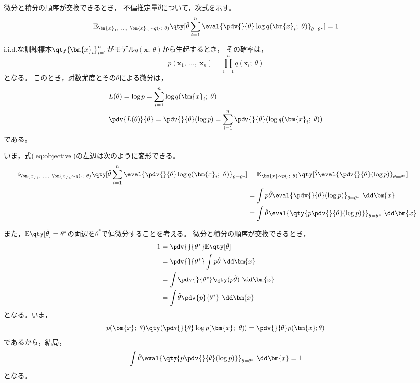 \documentclass[class=jsarticle, crop=false, dvipdfmx, fleqn]{standalone}
\begin{document}
\section{}

微分と積分の順序が交換できるとき，
不偏推定量\(\hat{\theta}\)について，次式を示す。
\begin{equation}
	\mathbb{E}_{\bm{x}_1,\ \dots,\ \bm{x}_n \sim q(\cdot;\ \theta)}
			\qty[\hat{\theta} \sum_{i=1}^{n} \eval{\pdv{}{\theta} \log{q(\bm{x}_i;\ \theta)}}_{\theta = \theta^*}]
	= 1
	\label{eq:objective}
\end{equation}

i.i.d.な訓練標本\(\qty{\bm{x}_i}_{i=1}^{n}\)がモデル\(q(\bm{x};\ \theta)\)から生起するとき，
その確率は，
\begin{equation}
	p(\bm{x}_1,\ \dots,\ \bm{x}_n) = \prod_{i=1}^{n} q(\bm{x}_i;\ \theta)
\end{equation}
となる。
このとき，対数尤度とその\(\theta\)による微分は，
\begin{align}
	& L(\theta) = \log{p} = \sum_{i=1}^{n} \log{q(\bm{x}_i;\ \theta)} \\
	& \pdv{L(\theta)}{\theta} = \pdv{}{\theta} (\log{p}) = \sum_{i=1}^{n} \pdv{}{\theta} (\log{q(\bm{x}_i;\ \theta)})
\end{align}
である。

いま，式(\ref{eq:objective})の左辺は次のように変形できる。
\begin{align}
	\mathbb{E}_{\bm{x}_1,\ \dots,\ \bm{x}_n \sim q(\cdot;\ \theta)}
			\qty[\hat{\theta} \sum_{i=1}^{n} \eval{\pdv{}{\theta} \log{q(\bm{x}_i;\ \theta)}}_{\theta = \theta^*}]
		& = \mathbb{E}_{\bm{x} \sim p(\cdot;\ \theta)} \qty[\hat{\theta} \eval{\pdv{}{\theta} (\log{p})}_{\theta = \theta^*}] \\
		& = \int p \hat{\theta} \eval{\pdv{}{\theta} (\log{p})}_{\theta = \theta^*} \ \dd\bm{x}
			\notag \\
		& = \int \hat{\theta} \eval{\qty{p \pdv{}{\theta} (\log{p})}}_{\theta = \theta^*} \ \dd\bm{x} 
			\label{eq:1}
\end{align}

また，\(\mathbb{E}\qty[\hat{\theta}] = \theta^{*}\)の両辺を\(\theta^{*}\)で偏微分することを考える。
微分と積分の順序が交換できるとき，
\begin{align}
	1
	& = \pdv{}{\theta^{*}} \mathbb{E}\qty[\hat{\theta}] \\
	& = \pdv{}{\theta^{*}} \int p \hat{\theta} \ \dd\bm{x} \\
	& = \int \pdv{}{\theta^{*}} \qty(p \hat{\theta}) \ \dd\bm{x} \\
	& = \int \hat{\theta} \pdv{p}{\theta^{*}} \ \dd\bm{x}
\end{align}
となる。いま，
\begin{equation}
	p(\bm{x};\ \theta) \qty(\pdv{}{\theta} \log{p(\bm{x};\ \theta)}) = \pdv{}{\theta} p(\bm{x}; \theta)
\end{equation}
であるから，結局，
\begin{equation}
	\int \hat{\theta} \eval{\qty{p \pdv{}{\theta} (\log{p})}}_{\theta = \theta^*} \ \dd\bm{x} = 1
		\label{eq:2}
\end{equation}
となる。
\end{document}
